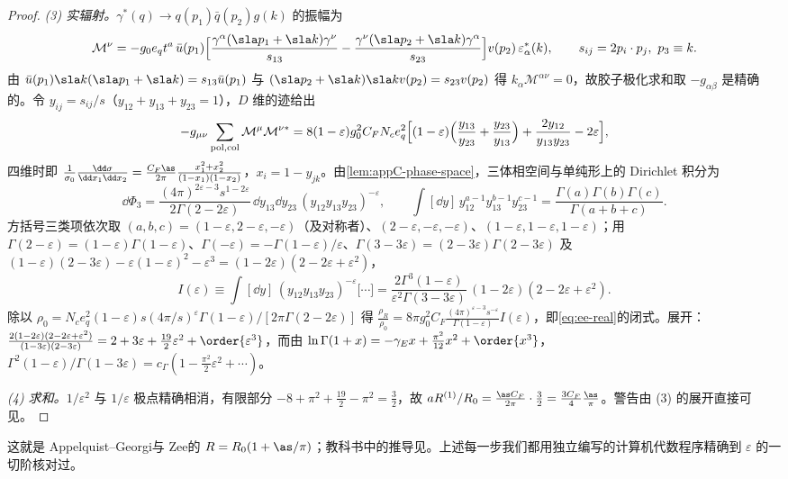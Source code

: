 \begin{proof}
\emph{(3) 实辐射。}$\gamma^*(q)\to q(p_1)\bar q(p_2)g(k)$ 的振幅为
\[
\mathcal M^\nu=-g_0e_qt^a\,\bar u(p_1)\Big[\frac{\gamma^\alpha(\sla p_1+\sla k)\gamma^\nu}{s_{13}}-\frac{\gamma^\nu(\sla p_2+\sla k)\gamma^\alpha}{s_{23}}\Big]v(p_2)\,\varepsilon^*_\alpha(k),\qquad s_{ij}=2p_i\cdot p_j,\ p_3\equiv k .
\]
由 $\bar u(p_1)\sla k(\sla p_1+\sla k)=s_{13}\bar u(p_1)$ 与 $(\sla p_2+\sla k)\sla kv(p_2)=s_{23}v(p_2)$ 得 $k_\alpha\mathcal M^{\alpha\nu}=0$，故胶子极化求和取 $-g_{\alpha\beta}$ 是精确的。令 $y_{ij}=s_{ij}/s$（$y_{12}+y_{13}+y_{23}=1$），$D$ 维的迹给出
\begin{equation}\label{eq:ee-realme}
-g_{\mu\nu}\sum_{\rm pol,col}\mathcal M^\mu\mathcal M^{\nu*}=8(1-\varepsilon)g_0^2C_FN_ce_q^2\Big[(1-\varepsilon)\Big(\frac{y_{13}}{y_{23}}+\frac{y_{23}}{y_{13}}\Big)+\frac{2y_{12}}{y_{13}y_{23}}-2\varepsilon\Big] ,
\end{equation}
四维时即 $\frac{1}{\sigma_0}\frac{\dd\sigma}{\dd x_1\dd x_2}=\frac{C_F\as}{2\pi}\frac{x_1^2+x_2^2}{(1-x_1)(1-x_2)}$，$x_i=1-y_{jk}$。由\cref{lem:appC-phase-space}，三体相空间与单纯形上的 Dirichlet 积分为
\[
\dd\Phi_3=\frac{(4\pi)^{2\varepsilon-3}s^{1-2\varepsilon}}{2\Gamma(2-2\varepsilon)}\,\dd y_{13}\dd y_{23}\,(y_{12}y_{13}y_{23})^{-\varepsilon},\qquad
\int[\dd y]\,y_{12}^{a-1}y_{13}^{b-1}y_{23}^{c-1}=\frac{\Gamma(a)\Gamma(b)\Gamma(c)}{\Gamma(a+b+c)} .
\]
方括号三类项依次取 $(a,b,c)=(1-\varepsilon,2-\varepsilon,-\varepsilon)$（及对称者）、$(2-\varepsilon,-\varepsilon,-\varepsilon)$、$(1-\varepsilon,1-\varepsilon,1-\varepsilon)$；用 $\Gamma(2-\varepsilon)=(1-\varepsilon)\Gamma(1-\varepsilon)$、$\Gamma(-\varepsilon)=-\Gamma(1-\varepsilon)/\varepsilon$、$\Gamma(3-3\varepsilon)=(2-3\varepsilon)\Gamma(2-3\varepsilon)$ 及 $(1-\varepsilon)(2-3\varepsilon)-\varepsilon(1-\varepsilon)^2-\varepsilon^3=(1-2\varepsilon)(2-2\varepsilon+\varepsilon^2)$，
\[
I(\varepsilon)\equiv\int[\dd y]\,(y_{12}y_{13}y_{23})^{-\varepsilon}\big[\cdots\big]=\frac{2\Gamma^3(1-\varepsilon)}{\varepsilon^2\Gamma(3-3\varepsilon)}\,(1-2\varepsilon)(2-2\varepsilon+\varepsilon^2).
\]
除以 $\rho_0=N_ce_q^2(1-\varepsilon)s(4\pi/s)^\varepsilon\Gamma(1-\varepsilon)/[2\pi\Gamma(2-2\varepsilon)]$ 得 $\frac{\rho_R}{\rho_0}=8\pi g_0^2C_F\frac{(4\pi)^{\varepsilon-3}s^{-\varepsilon}}{\Gamma(1-\varepsilon)}I(\varepsilon)$，即\cref{eq:ee-real}的闭式。展开：$\frac{2(1-2\varepsilon)(2-2\varepsilon+\varepsilon^2)}{(1-3\varepsilon)(2-3\varepsilon)}=2+3\varepsilon+\frac{19}2\varepsilon^2+\order{\varepsilon^3}$，而由 $\ln\Gamma(1+x)=-\gamma_Ex+\frac{\pi^2}{12}x^2+\order{x^3}$，$\Gamma^2(1-\varepsilon)/\Gamma(1-3\varepsilon)=c_\Gamma(1-\frac{\pi^2}2\varepsilon^2+\cdots)$。

\emph{(4) 求和。}$1/\varepsilon^2$ 与 $1/\varepsilon$ 极点精确相消，有限部分 $-8+\pi^2+\frac{19}2-\pi^2=\frac32$，故 $aR^{(1)}/R_0=\frac{\as C_F}{2\pi}\cdot\frac32=\frac{3C_F}4\frac{\as}\pi$。警告由 (3) 的展开直接可见。
\end{proof}
这就是 Appelquist--Georgi\cite{AppelquistGeorgi1973}与 Zee\cite{Zee1973}的 $R=R_0(1+\as/\pi)$；教科书中的推导见\cite{EllisStirlingWebber1996}。上述每一步我们都用独立编写的计算机代数程序精确到 $\varepsilon$ 的一切阶核对过。

